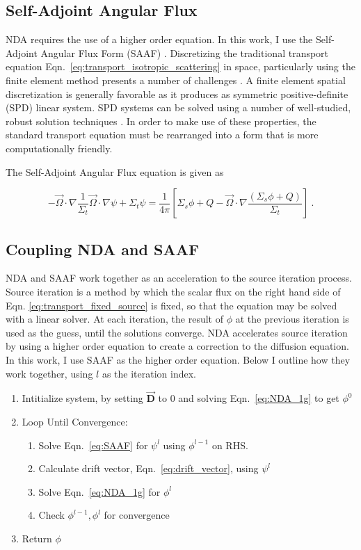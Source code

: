 \subsection{Self-Adjoint Angular Flux}
NDA requires the use of a higher order equation. In this work, I use the Self-Adjoint Angular Flux Form (SAAF) \cite{saaf}. Discretizing the traditional transport equation Eqn.~\eqref{eq:transport_isotropic_scattering} in space, particularly using the finite element method presents a number of challenges \cite{saaf}. A finite element spatial discretization is generally favorable as it produces as symmetric positive-definite (SPD) linear system. SPD systems can be solved using a number of well-studied, robust solution techniques \cite{Shewchuck1994}. In order to make use of these properties,  the standard transport equation must be rearranged into a form that is more computationally friendly.

The Self-Adjoint Angular Flux equation is given as

\begin{equation}
    - \vec{\Omega} \cdot \nabla \frac{1}{\Sigma_t}\vec{\Omega} \cdot \nabla \psi + \Sigma_t \psi = \frac{1}{4\pi}[\Sigma_s\phi + Q - \vec{\Omega} \cdot \nabla \frac{(\Sigma_s\phi + Q)}{\Sigma_t}]\:.
    \label{eq:SAAF}
\end{equation}


\subsection{Coupling NDA and SAAF}
NDA and SAAF work together as an acceleration to the source iteration process. Source iteration is a method by which the scalar flux on the right hand side of Eqn. \eqref{eq:transport_fixed_source} is fixed, so that the equation may be solved with a linear solver. At each iteration, the result of $\phi$ at the previous iteration is used as the guess, until the solutions converge. NDA accelerates source iteration by using a higher order equation to create a correction to the diffusion equation. In this work, I use SAAF as the higher order equation. Below I outline how they work together, using $l$ as the iteration index.

\begin{enumerate}
    \item Intitialize system, by setting $\vec{\textbf{D}}$ to 0 and solving Eqn.~\eqref{eq:NDA_1g} to get $\phi^0$ 
    \item Loop Until Convergence:
        \begin{enumerate}
            \item Solve Eqn.~\eqref{eq:SAAF} for $\psi^l$ using $\phi^{l-1}$ on RHS.
            \item Calculate drift vector, Eqn.~\eqref{eq:drift_vector}, using $\psi^l$
            \item Solve Eqn.~\eqref{eq:NDA_1g} for $\phi^l$
            \item Check $\phi^{l-1}, \phi^l$ for convergence
        \end{enumerate}
    \item Return $\phi$
\end{enumerate}

